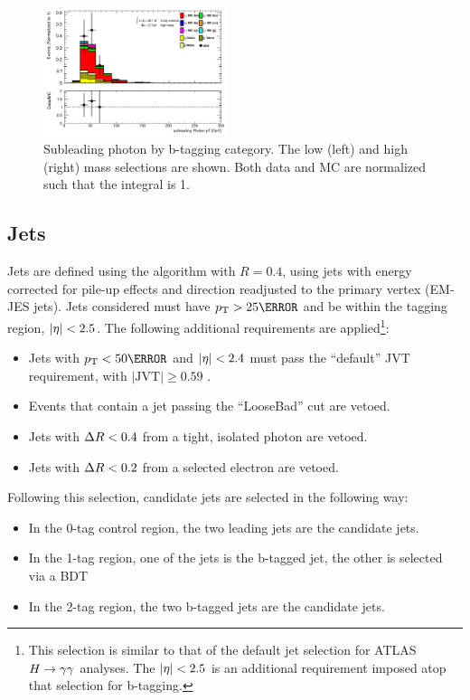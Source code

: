 \begin{figure}[htbp]
  \includegraphics[width=0.48\textwidth]{chapters/chapter5_yybb/images/data_MC_comparison/h_SR_h_2t_nominal_subleadingPhoton_pt.pdf}
  \caption[Subleading photon \pt.]{Subleading photon \pt by b-tagging category. The low (left) and high (right) mass selections are shown. Both data and MC are normalized such that the integral is 1.
  \label{fig:photon_s_pt}}
\end{figure}


\subsection{Jets}

Jets are defined using the \antikt algorithm with $R=0.4$, using jets with energy corrected for pile-up effects and direction readjusted to the primary vertex (EM-JES jets). Jets considered must have $\pt > \unit{25}{\GeV}$ and be within the tagging region, $|\eta| < 2.5$. The following additional requirements are applied\footnote{This selection is similar to that of the default jet selection for ATLAS $H\rightarrow \gamma\gamma$ analyses. The $|\eta| < 2.5$ is an additional requirement imposed atop that selection for b-tagging.}:

\begin{itemize}
  \item Jets with $\pt < \unit{50}{\GeV}$ and $|\eta| < 2.4$ must pass the ``default'' \gls{JVT} requirement, with $|\text{JVT}| \geq 0.59$ \cite{JVT}.
  \item Events that contain a jet passing the ``LooseBad'' cut are vetoed. 
  \item Jets with $\Delta R < 0.4$ from a tight, isolated photon are vetoed.
  \item Jets with $\Delta R < 0.2$ from a selected electron are vetoed.
\end{itemize}



Following this selection, candidate jets are selected in the following way:
\begin{itemize}
  \item In the 0-tag control region, the two leading jets are the candidate jets.
  \item In the 1-tag region, one of the jets is the b-tagged jet, the other is selected via a \gls{BDT}
  \item In the 2-tag region, the two b-tagged jets are the candidate jets.
\end{itemize}

